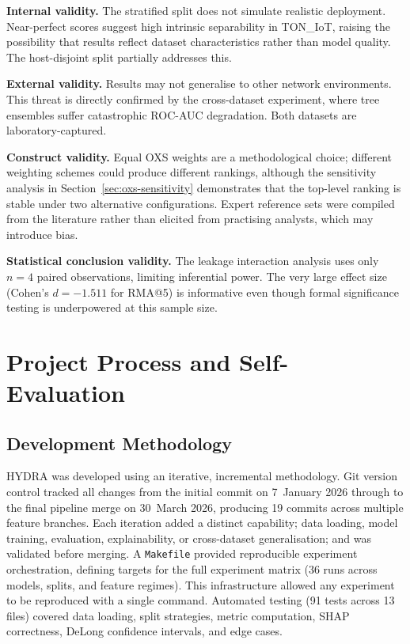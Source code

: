 \documentclass[12pt,a4paper]{report}
\begin{document}
\textbf{Internal validity.} The stratified split does not simulate realistic deployment. Near-perfect scores suggest high intrinsic separability in TON\_IoT, raising the possibility that results reflect dataset characteristics rather than model quality. The host-disjoint split partially addresses this.

\textbf{External validity.} Results may not generalise to other network environments. This threat is directly confirmed by the cross-dataset experiment, where tree ensembles suffer catastrophic ROC-AUC degradation. Both datasets are laboratory-captured.

\textbf{Construct validity.} Equal OXS weights are a methodological choice; different weighting schemes could produce different rankings, although the sensitivity analysis in Section~\ref{sec:oxs-sensitivity} demonstrates that the top-level ranking is stable under two alternative configurations. Expert reference sets were compiled from the literature rather than elicited from practising analysts, which may introduce bias.

\textbf{Statistical conclusion validity.} The leakage interaction analysis uses only $n = 4$ paired observations, limiting inferential power. The very large effect size (Cohen's $d = -1.511$ for RMA@5) is informative even though formal significance testing is underpowered at this sample size.

\section{Project Process and Self-Evaluation}
\label{sec:self-evaluation}

\subsection*{Development Methodology}

HYDRA was developed using an iterative, incremental methodology. Git version control tracked all changes from the initial commit on 7~January 2026 through to the final pipeline merge on 30~March 2026, producing 19 commits across multiple feature branches. Each iteration added a distinct capability; data loading, model training, evaluation, explainability, or cross-dataset generalisation; and was validated before merging. A \texttt{Makefile} provided reproducible experiment orchestration, defining targets for the full experiment matrix (36 runs across models, splits, and feature regimes). This infrastructure allowed any experiment to be reproduced with a single command. Automated testing (91 tests across 13 files) covered data loading, split strategies, metric computation, SHAP correctness, DeLong confidence intervals, and edge cases.
\end{document}
